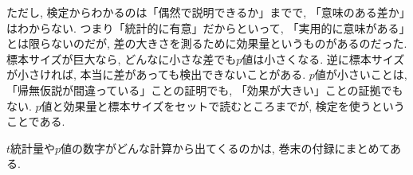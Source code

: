     ただし, 検定からわかるのは「偶然で説明できるか」までで, 「意味のある差か」はわからない.
    つまり「統計的に有意」だからといって, 「実用的に意味がある」とは限らないのだが, 差の大きさを測るために効果量というものがあるのだった.
    標本サイズが巨大なら, どんなに小さな差でも$p$値は小さくなる.
    逆に標本サイズが小さければ, 本当に差があっても検出できないことがある.
    $p$値が小さいことは, 「帰無仮説が間違っている」ことの証明でも, 「効果が大きい」ことの証拠でもない.
    $p$値と効果量と標本サイズをセットで読むところまでが, 検定を使うということである.


    $t$統計量や$p$値の数字がどんな計算から出てくるのかは, 巻末の付録にまとめてある.
